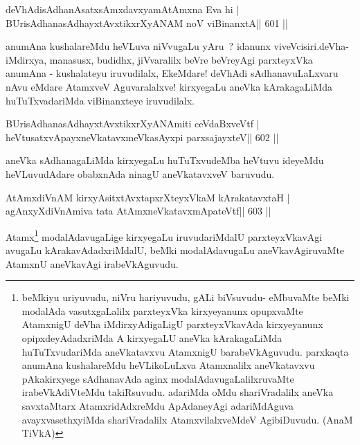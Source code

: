 \begin{shl}
deVhAdisAdhanAsatxsAmxdavxyamAtAmxna Eva hi |
BUrisAdhanasAdhayxtAvxtikxrXyANAM noV viBinanxtA\hfill || 601 ||
\end{shl}

\begin{artha}
anumAna kushalareMdu heVLuva niVvugaLu yAru~? idanunx viveVcisiri.\break deVha-iMdirxya, manasusx, budidhx, jiVvaralilx beVre beVreyAgi parxteyxVka anumAna - kushalateyu iruvudilalx, EkeMdare! deVhAdi sAdhanavuLaLxvaru nAvu eMdare AtamxveV Aguvaralalxve! kirxyegaLu aneVka kArakagaLiMda huTuTxvadariMda viBinanxteye iruvudilalx.
\end{artha}

\begin{shl}
BUrisAdhanasAdhayxtAvxtikxrXyANAmiti ceVdaBxveVtf |
heVtusatxvApayxneVkatavxmeVkasAyxpi parxsajayxteV\hfill || 602 ||
\end{shl}

\begin{artha}
aneVka sAdhanagaLiMda kirxyegaLu huTuTxvudeMba heVtuvu ideyeMdu heVLuvudAdare obabxnAda ninagU aneVkatavxveV baruvudu.
\end{artha}



\begin{shl}
AtAmxdiVnAM kirxyAsitxtAvxtapxrXteyxVkaM kArakatavxtaH |
agAnxyXdiVnAmiva tata AtAmxneVkatavxmApateVtf\hfill || 603 ||
\end{shl}

\begin{artha}
Atamx\footnote{beMkiyu uriyuvudu, niVru hariyuvudu, gALi biVsuvudu-
eMbuvaMte beMki modalAda vasutxgaLalilx parxteyxVka kirxyeyanunx
opupxvaMte AtamxnigU deVha iMdirxyAdigaLigU parxteyxVkavAda
kirxyeyanunx opipxdeyAdadxriMda A kirxyegaLU aneVka kArakagaLiMda
huTuTxvudariMda aneVkatavxvu AtamxnigU barabeVkAguvudu. parxkaqta
anumAna kushalareMdu heVLikoLuLxva Atamxnalilx aneVkatavxvu
pAkakirxyege sAdhanavAda aginx modalAdavugaLalilxruvaMte
irabeVkAdiVteMdu takiRsuvudu. adariMda oMdu shariVradalilx aneVka
savxtaMtarx AtamxridAdxreMdu ApAdaneyAgi adariMdAguva
avayxvasethxyiMda shariVradalilx AtamxvilalxveMdeV AgibiDuvudu. 
(AnaM TiVkA)} modalAdavugaLige kirxyegaLu iruvudariMdalU
parxteyxVkavAgi avugaLu kArakavAdadxriMdalU, beMki modalAdavugaLu
aneVkavAgiruvaMte AtamxnU aneVkavAgi irabeVkAguvudu.
\end{artha}


